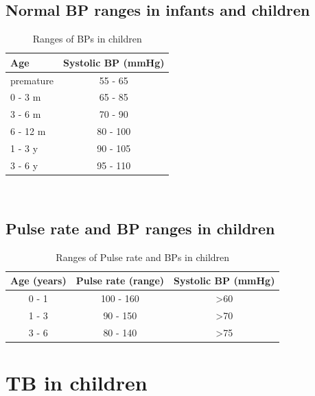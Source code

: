 \documentclass[11pt,a4paper]{report}
\begin{document}
\subsection{Normal BP ranges in infants and children}
\begin{table}[ht]
	\centering
	\caption{Ranges of BPs in children}
	\begin{tabular}{l|c}
		\toprule[1.5pt]
		Age 		& Systolic BP (mmHg) \\
		\midrule
		premature 	& 55 - 65 \\
		0 - 3 m 	& 65 - 85 \\
		3 - 6 m 	& 70 - 90 \\
		6 - 12 m 	& 80 - 100 \\
		1 - 3 y 	& 90 - 105 \\
		3 - 6 y 	& 95 - 110 \\
		\bottomrule[1.5pt]
	\end{tabular}
	\begin{flushleft} 
	\end{flushleft}
	\label{Systolic BP}
\end{table}

~\\
\subsection{Pulse rate and BP ranges in children}
\begin{table}[ht]
	\centering
	\caption{Ranges of Pulse rate and BPs in children}
	\begin{tabular}{c|c|c} 
		\toprule[1.5pt]
		Age (years) 	& Pulse rate (range) 	& Systolic BP (mmHg) \\ 
		\midrule
		0 - 1 			& 100 - 160 			& \textgreater 60 \\ 
		1 - 3 			& 90 - 150 				& \textgreater 70 \\
		3 - 6	 		& 80 - 140 				& \textgreater 75 \\
		\bottomrule[1.5pt]
	\end{tabular}
	\begin{flushleft} 
	\end{flushleft}
	\label{Pulse BP}
\end{table}

\newpage
\section{TB in children}
\end{document}
